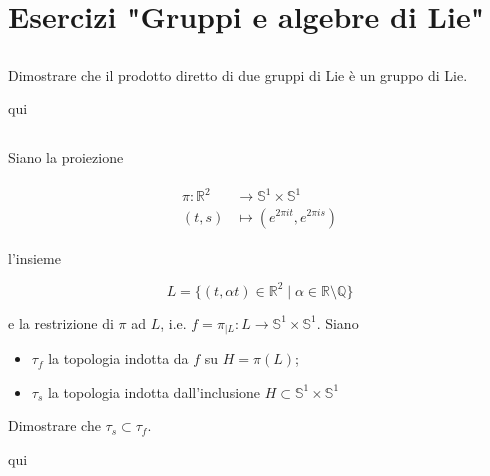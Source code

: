 \chapter{Esercizi "Gruppi e algebre di Lie"}

\tocless\section{}\label{es3-1}

\begin{tcolorbox}
	Dimostrare che il prodotto diretto di due gruppi di Lie è un gruppo di Lie.
\end{tcolorbox}

qui

\tocless\section{}\label{es3-2}

\begin{tcolorbox}
	Siano la proiezione
	
	\begin{align}
		\begin{split}
			\pi : \mathbb{R}^{2} &\to \mathbb{S}^{1} \times \mathbb{S}^{1}\\
			(t,s) &\mapsto (e^{2 \pi i t},e^{2 \pi i s})
		\end{split}
	\end{align}

	l'insieme
	
	\begin{equation}
		L = \{ (t,\alpha t) \in \mathbb{R}^{2} \mid \alpha \in \mathbb{R} \setminus \mathbb{Q} \}
	\end{equation}

	e la restrizione di $ \pi $ ad $ L $, i.e. $ f = \pi_{|L} : L \to \mathbb{S}^{1} \times \mathbb{S}^{1} $. Siano
	
	\begin{itemize}
		\item $ \tau_{f} $ la topologia indotta da $ f $ su $ H = \pi(L) $;
		
		\item $ \tau_{s} $ la topologia indotta dall'inclusione $ H \subset \mathbb{S}^{1} \times \mathbb{S}^{1} $
	\end{itemize}

	Dimostrare che $ \tau_{s} \subset \tau_{f} $.
\end{tcolorbox}

qui

